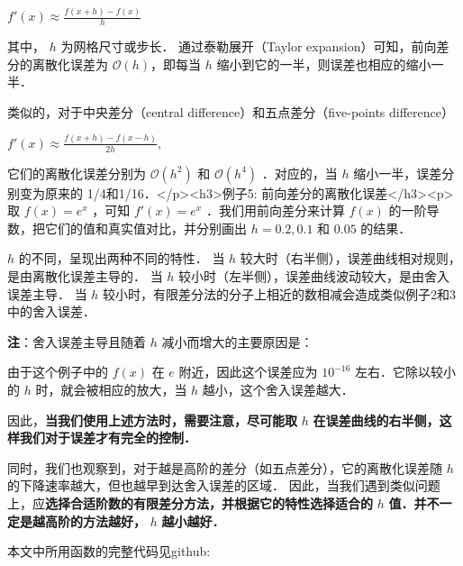 $f'(x)\approx \frac{f(x+h)-f(x)}{h}$  

其中，  $h$  为网格尺寸或步长． 通过泰勒展开（Taylor expansion）可知，前向差分的离散化误差为 $\mathcal{O}(h)$，即每当 $h$ 缩小到它的一半，则误差也相应的缩小一半．

类似的，对于中央差分（central difference）和五点差分（five-points difference）

$f'(x)\approx \frac{f(x+h)-f(x-h)}{2h},$


它们的离散化误差分别为 $\mathcal{O}(h^2)$ 和  $\mathcal{O}(h^4)$  ．对应的，当  $h$  缩小一半，误差分别变为原来的 1/4和1/16．</p><h3>例子5: 前向差分的离散化误差</h3><p>取  $f(x)=e^x$  ，可知  $f'(x)=e^x$  ．我们用前向差分来计算  $f(x)$  的一阶导数，把它们的值和真实值对比，并分别画出  $h=0.2, 0.1$  和  $0.05$  的结果．

$h$  的不同，呈现出两种不同的特性．
当  $h$  较大时（右半侧），误差曲线相对规则，是由离散化误差主导的．
当  $h$  较小时（左半侧），误差曲线波动较大，是由舍入误差主导．
当  $h$  较小时，有限差分法的分子上相近的数相减会造成类似例子2和3中的舍入误差．

\textbf{注}：舍入误差主导且随着  $h$  减小而增大的主要原因是： 

由于这个例子中的  $f(x)$ 在  $e$  附近，因此这个误差应为 $10^{-16}$ 左右．它除以较小的 $h$ 时，就会被相应的放大，当  $h$  越小，这个舍入误差越大．

因此，\textbf{当我们使用上述方法时，需要注意，尽可能取}  $h$  \textbf{在误差曲线的右半侧，这样我们对于误差才有完全的控制．}

同时，我们也观察到，对于越是高阶的差分（如五点差分），它的离散化误差随  $h$  的下降速率越大，但也越早到达舍入误差的区域． 因此，当我们遇到类似问题上，应\textbf{选择合适阶数的有限差分方法，并根据它的特性选择适合的}  $h$  \textbf{值．并不一定是越高阶的方法越好，}  $h$  \textbf{越小越好．}

本文中所用函数的完整代码见github:
